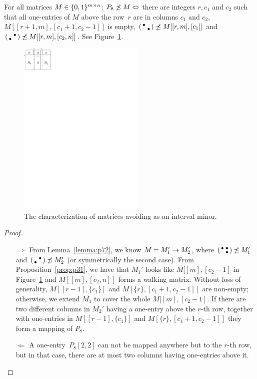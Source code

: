 \begin{prop}
\label{prop:p72}
For all matrices $M\in\{0,1\}^{m\times n}$: $P_8\not\preceq M\Leftrightarrow$ there are integers $r,c_1$ and $c_2$ such that all one-entries of $M$ above the row~$r$ are in columns $c_1$ and $c_2$, $M[[r+1,m],[c_1+1,c_2-1]]$ is empty, $\left(\begin{smallmatrix}\bullet& \\ &\bullet\end{smallmatrix}\right)\not\preceq M[[r,m],[c_1]]$ and $\left(\begin{smallmatrix} &\bullet\\\bullet& \end{smallmatrix}\right)\not\preceq M[[r,m],[c_2,n]]$. See Figure~\ref{fig:p72}.
\end{prop}
\begin{figure}[!ht]
\centering
\includegraphics[width=60mm]{img/p72.pdf}
\caption{The characterization of matrices avoiding \usebox{\smlmatc} as an interval minor.}
\label{fig:p72}
\end{figure}
\begin{proof}
\begin{itemize}
	\item[$\Rightarrow$] From Lemma~\ref{lemma:p72}, we know $M=M_1'\rightarrow M_2'$, where $\left(\begin{smallmatrix}\bullet&\bullet\\ &\bullet\end{smallmatrix}\right)\not\preceq M_1'$ and $\left(\begin{smallmatrix} &\bullet\\\bullet& \end{smallmatrix}\right)\not\preceq M_2'$ (or symmetrically the second case). From Proposition~\ref{prop:p31}, we have that $M_1'$ looks like $M[[m],[c_2-1]$ in Figure~\ref{fig:p72} and $M[[m],[c_2,n]]$ forms a walking matrix. Without loss of generality, $M[[r-1],\{c_1\}]$ and $M[\{r\},[c_1+1,c_2-1]]$ are non-empty; otherwise, we extend $M_1$ to cover the whole $M[[m],[c_2-1]$. If there are two different columns in $M_2'$ having a one-entry above the $r$-th row, together with one-entries in $M[[r-1],\{c_1\}]$ and $M[\{r\},[c_1+1,c_2-1]]$ they form a mapping of $P_8$.
	\item[$\Leftarrow$] A one-entry~$P_8[2,2]$ can not be mapped anywhere but to the $r$-th row, but in that case, there are at most two columns having one-entries above it.
\end{itemize}
\end{proof}

